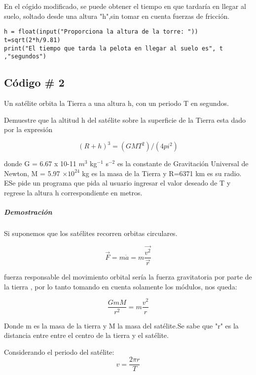 \documentclass[12pt]{article}
\begin{document}
En el cógido modificado, se puede obtener el tiempo en que tardaría en llegar al suelo, soltado desde una altura "h",sin tomar en cuenta fuerzas de fricción.

\begin{verbatim}
h = float(input("Proporciona la altura de la torre: "))
t=sqrt(2*h/9.81)
print("El tiempo que tarda la pelota en llegar al suelo es", t ,"segundos")
\end{verbatim}


\subsection{Código \# 2}

Un satélite orbita la Tierra a una altura h, con un periodo T en segundos.

Demuestre que la altitud h del satélite sobre la superficie de la Tierra esta dado por la expresión

 
\begin{equation}
(R + h)^3 = (GMT^2)/(4 pi^2)
\end{equation}


 

donde G = 6.67 x 10-11 $m^3$ kg$^{-1}$ s$^{-2}$ es la constante de Gravitación Universal de Newton, M = 5.97 $\times 10^{24}$ kg es la masa de la Tierra y R=6371 km es su radio.
ESe pide un programa que pida al usuario ingresar el valor deseado de T y regrese la altura h correspondiente en metros.

\subparagraph*{Demostración}
\newcommand{\QED}{\hfill \textit{\textbf{Q.E.D.}}}
Si suponemos que los satélites recorren orbitas circulares.

\begin{equation}
\overrightarrow{F}=m\dot{a}=m\frac{\overrightarrow{v^2}}{\overrightarrow{r}}    
\end{equation}




fuerza responsable del movimiento orbital sería la fuerza gravitatoria por parte de la tierra , por lo tanto tomando en cuenta solamente los módulos, nos queda:

 \begin{equation}
\frac{GmM}{r^2}=m\frac{v^2}{r}
\end{equation}

Donde m es la masa de la tierra y M la masa del satélite.Se sabe que "r" es la distancia entre entre el centro de la tierra y el satélite.

Considerando el periodo del satélite:
\begin{equation}
 v=\frac{2\pi r}{T}
\end{equation}
\end{document}
